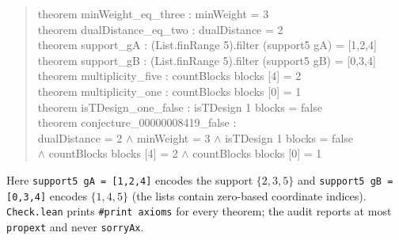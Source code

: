 \documentclass[11pt]{article}
\theoremstyle{definition}
\theoremstyle{remark}
\begin{document}
\begin{quote}\ttfamily
theorem minWeight\_eq\_three : minWeight = 3\\
theorem dualDistance\_eq\_two : dualDistance = 2\\
theorem support\_gA : (List.finRange 5).filter (support5 gA) = [1,2,4]\\
theorem support\_gB : (List.finRange 5).filter (support5 gB) = [0,3,4]\\
theorem multiplicity\_five : countBlocks blocks [4] = 2\\
theorem multiplicity\_one : countBlocks blocks [0] = 1\\
theorem isTDesign\_one\_false : isTDesign 1 blocks = false\\
theorem conjecture\_00000008419\_false :\\
\hspace*{2em} dualDistance = 2 \(\wedge\) minWeight = 3 \(\wedge\) isTDesign 1 blocks = false\\
\hspace*{2em} \(\wedge\) countBlocks blocks [4] = 2 \(\wedge\) countBlocks blocks [0] = 1
\end{quote}

\noindent Here \texttt{support5 gA = [1,2,4]} encodes the support
$\{2,3,5\}$ and \texttt{support5 gB = [0,3,4]} encodes $\{1,4,5\}$ (the lists
contain zero-based coordinate indices). \texttt{Check.lean} prints
\texttt{\#print axioms} for every theorem; the audit reports at most
\texttt{propext} and never \texttt{sorryAx}.
\end{document}
